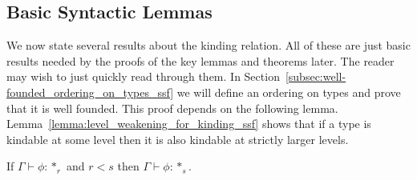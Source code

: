 \subsection{Basic Syntactic Lemmas}
\label{subsec:basic_syntactic_lemmas}
We now state several results about the kinding relation. All of these
are just basic results needed by the proofs of the key lemmas and
theorems later. The reader may wish to just quickly read through them.
In Section~\ref{subsec:well-founded_ordering_on_types_ssf} we will define an
ordering on types and prove that it is well founded.  This proof
depends on the following lemma.
Lemma~\ref{lemma:level_weakening_for_kinding_ssf} shows that if a type
is kindable at some level then it is also kindable at strictly larger
levels.

\begin{lemma}
  If $\Gamma \vdash \phi:*_r$ and $r < s$ then $\Gamma \vdash \phi:*_s$.
  \label{lemma:level_weakening_for_kinding_ssf}
\end{lemma}
